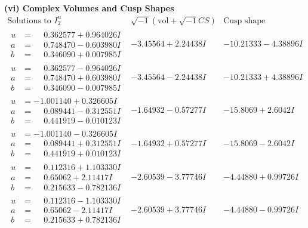 \documentclass[1p]{elsarticle_modified}
\theoremstyle{definition}
\newcommand{\I}{\sqrt{-1}}
\begin{document}
\newpage\flushleft \textbf{(vi) Complex Volumes and Cusp Shapes}
$$\begin{array}{c|c|c}  
\text{Solutions to }I^u_{2}& \I (\text{vol} + \sqrt{-1}CS) & \text{Cusp shape}\\
 \hline 
\begin{aligned}
u &= \phantom{-}0.362577 + 0.964026 I \\
a &= \phantom{-}0.748470 - 0.603980 I \\
b &= \phantom{-}0.346090 + 0.007985 I\end{aligned}
 & -3.45564 + 2.24438 I & -10.21333 - 4.38896 I \\ \hline\begin{aligned}
u &= \phantom{-}0.362577 - 0.964026 I \\
a &= \phantom{-}0.748470 + 0.603980 I \\
b &= \phantom{-}0.346090 - 0.007985 I\end{aligned}
 & -3.45564 - 2.24438 I & -10.21333 + 4.38896 I \\ \hline\begin{aligned}
u &= -1.001140 + 0.326605 I \\
a &= \phantom{-}0.089441 - 0.312551 I \\
b &= \phantom{-}0.441919 - 0.010123 I\end{aligned}
 & -1.64932 - 0.57277 I & -15.8069 + 2.6042 I \\ \hline\begin{aligned}
u &= -1.001140 - 0.326605 I \\
a &= \phantom{-}0.089441 + 0.312551 I \\
b &= \phantom{-}0.441919 + 0.010123 I\end{aligned}
 & -1.64932 + 0.57277 I & -15.8069 - 2.6042 I \\ \hline\begin{aligned}
u &= \phantom{-}0.112316 + 1.103330 I \\
a &= \phantom{-}0.65062 + 2.11417 I \\
b &= \phantom{-}0.215633 - 0.782136 I\end{aligned}
 & -2.60539 - 3.77746 I & -4.44880 + 0.99726 I \\ \hline\begin{aligned}
u &= \phantom{-}0.112316 - 1.103330 I \\
a &= \phantom{-}0.65062 - 2.11417 I \\
b &= \phantom{-}0.215633 + 0.782136 I\end{aligned}
 & -2.60539 + 3.77746 I & -4.44880 - 0.99726 I \\ \hline\begin{aligned}

\end{aligned}
\end{array}$$
\end{document}
